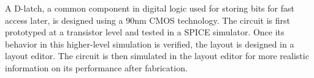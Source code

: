 A D-latch, a common component in digital logic used for storing bits for fast access later, is designed using a $90$\si{\nano\meter} CMOS technology.
The circuit is first prototyped at a transistor level and tested in a SPICE simulator.
Once its behavior in this higher-level simulation is verified, the layout is designed in a layout editor.
The circuit is then simulated in the layout editor for more realistic information on its performance after fabrication.
